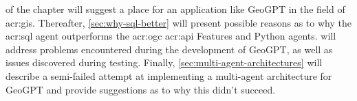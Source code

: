 \begin{comment}

In this section it is important to include a discussion of not just the merits of the work conducted, but also the limitations.
Which choices did you make? Why? What alternatives were there?
{\color{red}\textbf{Note that a key part of the Master's Thesis grading is based on the student's ability to discuss the results in light of the work by others as well as the restrictions and potential of the work itself.}}
While the Results section will report the outcome of each specific experiments, the Discussion should put those results into perspective and look at overall lessons that can be learned from the entire series of experiments.

You should be able to discuss your work in relation to its overall goal and your research questions (i.e., those introduced in Chapter~\ref{cha:introduction}),
but also address issues such as any ethical considerations that the work may entail,
as well as its technical challenges and limitations.

Discussion and evaluation can either be two different chapters, a joint chapter (as here), or part of the concluding chapter
--- or the discussion can be part of that chapter while the evaluation is part of the experimental chapter.

As for most parts of the thesis, it is possible to select various outlines and setups for the discussion; the important thing is that all the relevant parts appear \textit{somewhere\/} in the text.
\end{comment}

 of the  chapter will suggest a place for an application like GeoGPT in the field of \acrshort{acr:gis}. Thereafter, \autoref{sec:why-sql-better} will present possible reasons as to why the \acrshort{acr:sql} agent outperforms the \acrshort{acr:ogc} \acrshort{acr:api} Features and Python agents.  will address problems encountered during the development of GeoGPT, as well as issues discovered during testing. Finally, \autoref{sec:multi-agent-architectures} will describe a semi-failed attempt at implementing a multi-agent architecture for GeoGPT and provide suggestions as to why this didn't succeed.



